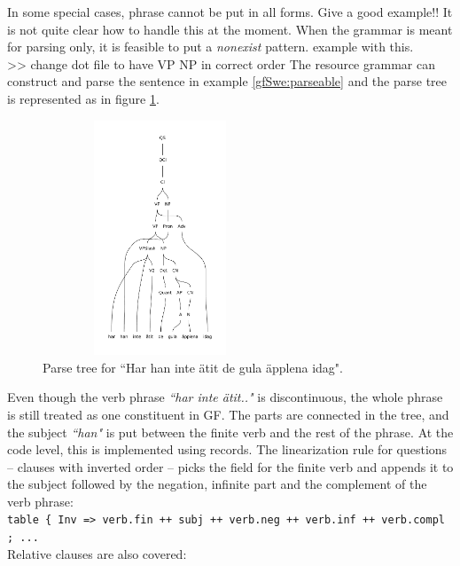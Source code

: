 \documentclass{report}
\begin{document}
In some special cases, phrase cannot be put in all forms. 
Give a good example!!
It is not quite clear how to handle this at the moment. When
the grammar is meant for parsing only, it is feasible to put
a \textit{nonexist} pattern.
example with this.\\

>> change dot file to have VP NP in correct order
\label{gfSwe:parseable}
The resource grammar can construct and parse the sentence in example
\ref{gfSwe:parseable}
and the parse tree is represented as in figure \ref{gfSwe:parsetree}.
\begin{figure}[h]
\includegraphics[width=70mm,height=70mm]{apples.pdf}
\caption{Parse tree for ``Har han inte ätit de gula äpplena idag".}
\label{gfSwe:parsetree}
\end{figure}
Even though the verb phrase \emph{``har inte ätit.."} is discontinuous, the whole
phrase is still treated as one constituent in GF. The parts
are connected in the tree, and the subject \emph{``han"} is put between the
finite verb and the rest of the phrase. At the code level, this is implemented
using records.
The linearization rule for questions -- clauses with inverted order -- picks 
the field for the finite verb and appends it to the subject followed by
the negation, infinite part and the complement of the verb phrase: \\
\verb|table { Inv => verb.fin ++ subj ++ verb.neg ++ verb.inf ++ verb.compl ; ... | \\

Relative clauses are also covered: 
\end{document}
